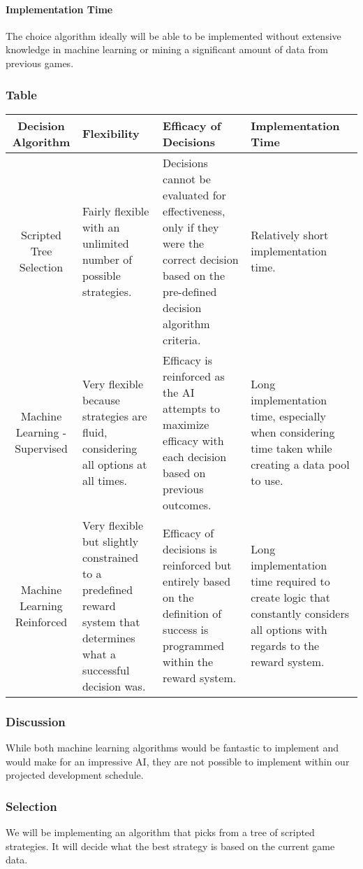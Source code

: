 \documentclass[10pt,letterpaper,onecolumn,draftclsnofoot]{IEEEtran}
\begin{document}
\paragraph{Implementation Time}
The choice algorithm ideally will be able to be implemented without extensive knowledge in machine learning or mining a significant amount of data from previous games.
\subsubsection{Table}
\begin{center}
	\begin{tabular}{ ||C|M|M|M|| } 
		\hline
		Decision Algorithm & Flexibility & Efficacy of Decisions & Implementation Time \\
		\hline
		Scripted Tree Selection & Fairly flexible with an unlimited number of possible strategies. & Decisions cannot be evaluated for effectiveness, only if they were the correct decision based on the pre-defined decision algorithm criteria. & Relatively short implementation time. \\ 
		\hline
		Machine Learning - Supervised & Very flexible because strategies are fluid, considering all options at all times. & Efficacy is reinforced as the AI attempts to maximize efficacy with each decision based on previous outcomes. & Long implementation time, especially when considering time taken while creating a data pool to use. \\ 
		\hline
		 Machine Learning Reinforced & Very flexible but slightly constrained to a predefined reward system that determines what a successful decision was. & Efficacy of decisions is reinforced but entirely based on the definition of success is programmed within the reward system. & Long implementation time required to create logic that constantly considers all options with regards to the reward system. \\ 
		\hline
	\end{tabular}
\end{center}
\subsubsection{Discussion}
While both machine learning algorithms would be fantastic to implement and would make for an impressive AI, they are not possible to implement within our projected development schedule. 
\subsubsection{Selection}
We will be implementing an algorithm that picks from a tree of scripted strategies. It will decide what the best strategy is based on the current game data.
\end{document}
